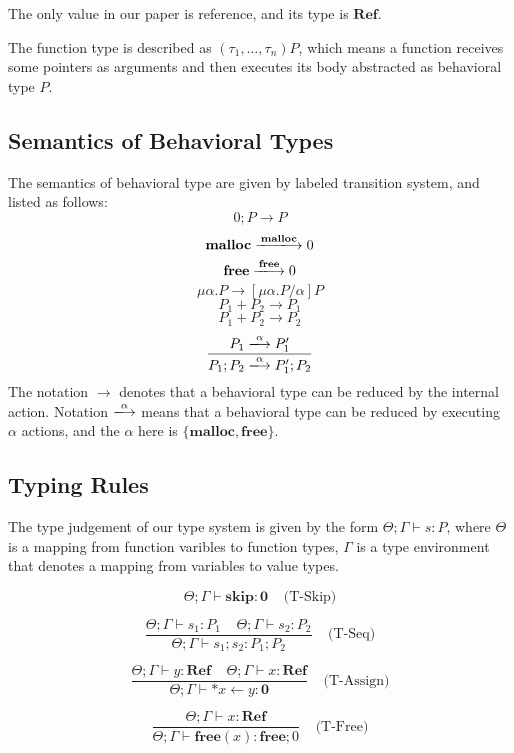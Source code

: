 \documentclass[english]{jssst_ppl} %
\newcommand\SKIP{\mathbf{skip}}
\newcommand\Rtab{\; \; \; \;}
\newcommand\Malloc{\mathbf{malloc}}
\newcommand\Free{\mathbf{free}}
\begin{document}
The only value in our paper is reference, and its type is $\mathbf{Ref}$.

The function type is described as $(\tau_{1}, \dots, \tau_{n})P$, which means a function receives some pointers as arguments and then executes its body abstracted as behavioral type $P$.

\subsection{Semantics of Behavioral Types}
The semantics of behavioral type are given by labeled transition system, and listed as follows:
    $$
         0;P \rightarrow P
    $$
    $$
          \Malloc \xlongrightarrow{\Malloc} 0
    $$
    $$
           \Free \xlongrightarrow{\Free} 0
    $$
    $$
          \mu \alpha.P \rightarrow  [\mu \alpha . P/\alpha]  P
    $$
   $$
          P_{1} + P_{2} \longrightarrow P_{1}
   $$
   $$
          P_{1} + P_{2} \longrightarrow P_{2}
   $$
   $$
           \frac{P_{1} \xlongrightarrow{\alpha} P_{1}' }
                 {P_{1};P_{2} \xlongrightarrow{\alpha} P_{1}';P_{2}}
   $$
The notation $\rightarrow$ denotes that a behavioral type can be reduced by the internal action. Notation $\xlongrightarrow{\alpha}$ means that a behavioral type can be reduced by executing $\alpha$ actions, and the $\alpha$ here is $\{\Malloc, \Free\}$.

\subsection{Typing Rules}
The type judgement of our type system is given by the form $\Theta ; \Gamma \vdash s : P$, where $\Theta$ is a mapping from function varibles to function types, $\Gamma$ is a type environment that denotes a mapping from variables to value types.

$$
         \Theta ; \Gamma \vdash \SKIP : \mathbf{0}
      \Rtab \mbox{(T-Skip)}
$$

$$
      \frac{\Theta ; \Gamma \vdash s_{1} : P_{1} \Rtab \Theta ; \Gamma \vdash s_{2} : P_{2}}
          {\Theta ; \Gamma \vdash s_{1} ; s_{2} : P_{1};P_{2} }
     \Rtab \mbox{(T-Seq)}
$$

$$
     \frac{\Theta ; \Gamma \vdash y :  \mathbf{Ref} \Rtab \Theta ; \Gamma \vdash x : \mathbf{Ref} }
          {\Theta ; \Gamma \vdash *x \leftarrow y : \mathbf{0} }
     \Rtab \mbox{(T-Assign)}
$$

$$
     \frac{\Theta ; \Gamma \vdash x : \mathbf{Ref} }
           {\Theta ; \Gamma \vdash \Free(x) : \Free;0}
     \Rtab \mbox{(T-Free)}
$$
\end{document}
